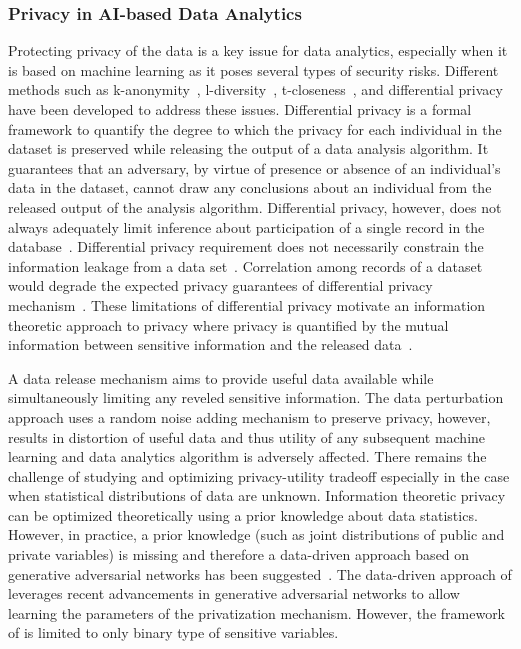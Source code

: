 \documentclass[a4paper,11pt]{article}
\begin{document}
\subsubsection{Privacy in AI-based Data Analytics}
\label{sect:privacy}
Protecting privacy of the data is a key issue for data analytics, especially when it is based on machine learning as it poses several types of security risks. Different methods such as k-anonymity~\cite{10.1142/S0218488502001648}, l-diversity~\cite{10.1145/1217299.1217302}, t-closeness~\cite{DBLP:conf/icde/LiLV07}, and differential privacy~\cite{10.1561/0400000042} have been developed to address these issues. Differential privacy is a formal framework to quantify the degree to which the privacy for each individual in the dataset is preserved while releasing the output of a data analysis algorithm. It guarantees that an adversary, by virtue of presence or absence of an individual's data in the dataset, cannot draw any conclusions about an individual from the released output of the analysis algorithm. Differential privacy, however, does not always adequately limit inference about participation of a single record in the database~\cite{10.1145/1989323.1989345}. Differential privacy requirement does not necessarily constrain the information leakage from a data set~\cite{Calmon_privacyagainst}. Correlation among records of a dataset would degrade the expected privacy guarantees of differential privacy mechanism~\cite{DBLP:conf/ndss/LiuMC16}. These limitations of differential privacy motivate an information theoretic approach to privacy where privacy is quantified by the mutual information between sensitive information and the released data~\cite{5288525,Calmon_privacyagainst,6482222,7888175,DBLP:journals/corr/abs-1710-09295}. 

A data release mechanism aims to provide useful data available while simultaneously limiting any reveled sensitive information. The data perturbation approach uses a random noise adding mechanism to preserve privacy, however, results in distortion of useful data and thus utility of any subsequent machine learning and data analytics algorithm is adversely affected. There remains the challenge of studying and optimizing privacy-utility tradeoff especially in the case when statistical distributions of data are unknown. Information theoretic privacy can be optimized theoretically using a prior knowledge about data statistics. However, in practice, a prior knowledge (such as joint distributions of public and private variables) is missing and therefore a data-driven approach based on generative adversarial networks has been suggested~\cite{Huang_2017}. The data-driven approach of \cite{Huang_2017} leverages recent advancements in generative adversarial networks to allow learning the parameters of the privatization mechanism. However, the framework of \cite{Huang_2017} is limited to only binary type of sensitive variables. 
\end{document}
